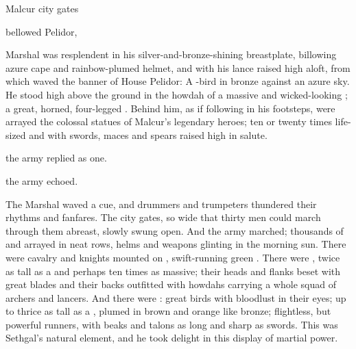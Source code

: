 \stamp
  {\dateTheArmySetsOut}
  {Malcur city gates}
%
%
%
\begin{comment}
\section{\Sethgal}
\end{comment}
 bellowed \rah[Sethgal] Pelidor, 

Marshal \Sethgal was resplendent in his silver-and-bronze-shining breastplate, billowing azure cape and rainbow-plumed helmet, and with his lance raised high aloft, from which waved the banner of House Pelidor: 
A \grulcan{}-bird in bronze against an azure sky. 
He stood high above the ground in the howdah of a massive and wicked-looking \muroc; a great, horned, four-legged \saurian.
Behind him, as if following in his footsteps, were arrayed the colossal statues of Malcur's legendary heroes; ten or twenty times life-sized and with swords, maces and spears raised high in salute. 


 the army replied as one. 


 the army echoed. 






The Marshal waved a cue, and drummers and trumpeters thundered their rhythms and fanfares. 
The \Malcuric{} city gates, so wide that thirty men could march through them abreast, slowly swung open.
And the army marched; thousands of \scathae and \humans arrayed in neat rows, helms and weapons glinting in the morning sun. 
There were cavalry and knights mounted on \relcs, swift-running green \saurians. 
There were \murocs, twice as tall as a \relc and perhaps ten times as massive; their heads and flanks beset with great blades and their backs outfitted with howdahs carrying a whole squad of archers and lancers. 
And there were \grulcans: great birds with bloodlust in their eyes; up to thrice as tall as a \scatha, plumed in brown and orange like bronze; flightless, but powerful runners, with beaks and talons as long and sharp as swords. 
This was Sethgal's natural element, and he took delight in this display of martial power. 

